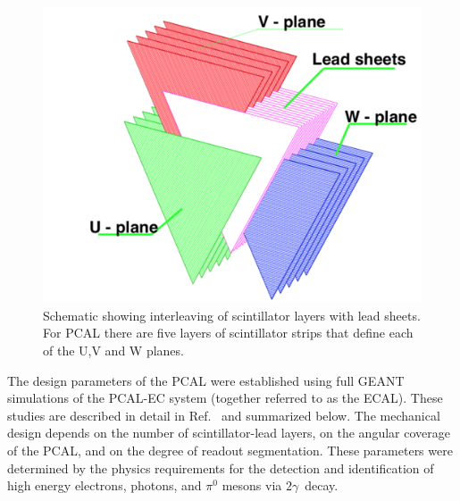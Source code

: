\begin{figure}[hbt]
\centering
\includegraphics[width=0.95\columnwidth,keepaspectratio]{img/S3_2.png}
\caption[PCAL UVW Layers]{Schematic showing interleaving of scintillator layers with lead sheets.  For PCAL there are five layers of scintillator strips that define each of the U,V and W planes. }
\label{fig:S3_2}
\end{figure}

The design parameters of the PCAL were established using full GEANT simulations of the PCAL-EC system
(together referred to as the ECAL). These studies are described in detail in Ref.~\cite{2007001} and
summarized below. The mechanical design depends on the number of scintillator-lead layers, on the angular
coverage of the PCAL, and on the degree of readout segmentation. These parameters were determined by
the physics requirements for the detection and identification of high energy electrons, photons, and $\pi^{0}$
mesons via $2\gamma$\ decay.

